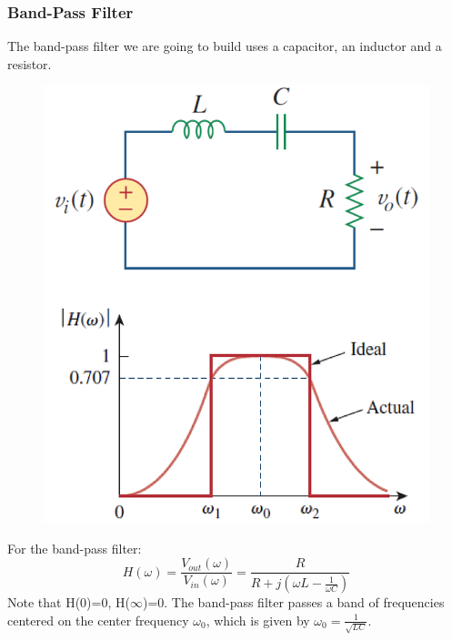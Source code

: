 \documentclass[12pt]{article}
\begin{document}
\subsubsection{Band-Pass Filter}
The band-pass filter we are going to build uses a capacitor, an inductor and a resistor.
\begin{figure}[H]
\centering
\includegraphics[scale=0.5]{P5.jpg}
\end{figure}
For the band-pass filter:
$$H(\omega)=\frac{V_{out}(\omega)}{V_{in}(\omega)}=\frac{R}{R+j(\omega L-\frac{1}{\omega C})}$$
Note that H(0)=0, H($\infty$)=0. The band-pass filter passes a band of frequencies centered on the center frequency $\omega_0$, which is given by $\omega_0=\frac{1}{\sqrt{LC}}$.
\end{document}
